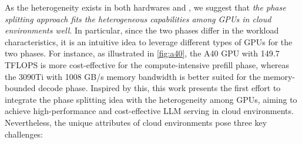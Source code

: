 As the heterogeneity exists in both hardwares and , we suggest that \textit{the phase splitting approach fits the heterogeneous capabilities among GPUs in cloud environments well}. 
In particular, since the two phases differ in the workload characteristics, it is an intuitive idea to leverage different types of GPUs for the two phases. For instance, as illustrated in \autoref{fig:a40}, the A40 GPU with 149.7 TFLOPS is more cost-effective for the compute-intensive prefill phase, whereas the 3090Ti with 1008 GB/s memory bandwidth is better suited for the memory-bounded decode phase.
Inspired by this, this work presents the first effort to integrate the phase splitting idea with the heterogeneity among GPUs, aiming to achieve high-performance and cost-effective LLM serving in cloud environments.
Nevertheless, the unique attributes of cloud environments pose three key challenges: 






